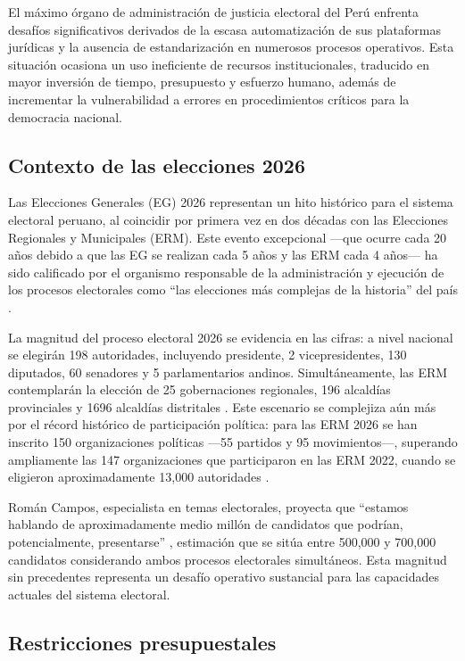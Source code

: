 \documentclass[12pt,a4paper,oneside]{book}
\begin{document}
El máximo órgano de administración de justicia electoral del Perú enfrenta desafíos significativos derivados de la escasa automatización de sus plataformas jurídicas y la ausencia de estandarización en numerosos procesos operativos. Esta situación ocasiona un uso ineficiente de recursos institucionales, traducido en mayor inversión de tiempo, presupuesto y esfuerzo humano, además de incrementar la vulnerabilidad a errores en procedimientos críticos para la democracia nacional.

\subsection{Contexto de las elecciones 2026}

Las Elecciones Generales (EG) 2026 representan un hito histórico para el sistema electoral peruano, al coincidir por primera vez en dos décadas con las Elecciones Regionales y Municipales (ERM). Este evento excepcional ---que ocurre cada 20 años debido a que las EG se realizan cada 5 años y las ERM cada 4 años--- ha sido calificado por el organismo responsable de la administración y ejecución de los procesos electorales como ``las elecciones más complejas de la historia'' del país \cite{onpe2022erm}.

La magnitud del proceso electoral 2026 se evidencia en las cifras: a nivel nacional se elegirán 198 autoridades, incluyendo presidente, 2 vicepresidentes, 130 diputados, 60 senadores y 5 parlamentarios andinos. Simultáneamente, las ERM contemplarán la elección de 25 gobernaciones regionales, 196 alcaldías provinciales y 1696 alcaldías distritales \cite{elcomercio2025erm}. Este escenario se complejiza aún más por el récord histórico de participación política: para las ERM 2026 se han inscrito 150 organizaciones políticas ---55 partidos y 95 movimientos---, superando ampliamente las 147 organizaciones que participaron en las ERM 2022, cuando se eligieron aproximadamente 13,000 autoridades \cite{jne2025candidatos}.

Román Campos, especialista en temas electorales, proyecta que ``estamos hablando de aproximadamente medio millón de candidatos que podrían, potencialmente, presentarse'' \cite{jne2025candidatos}, estimación que se sitúa entre 500,000 y 700,000 candidatos considerando ambos procesos electorales simultáneos. Esta magnitud sin precedentes representa un desafío operativo sustancial para las capacidades actuales del sistema electoral.

\subsection{Restricciones presupuestales}
\end{document}
